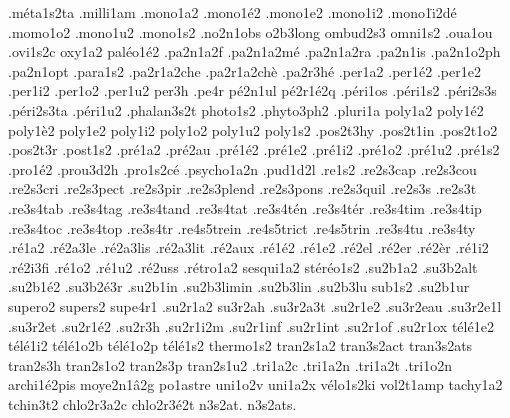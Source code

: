 {.m\'eta1s2ta
.milli1am
.mono1a2
.mono1\'e2
.mono1e2
.mono1i2
.mono1\"\i2d\'e
.momo1o2
.mono1u2
.mono1s2
.no2n1obs
o2b3long
ombud2s3
omni1s2
.oua1ou
.ovi1s2c
oxy1a2
pal\'eo1\'e2
.pa2n1a2f
.pa2n1a2m\'e
.pa2n1a2ra
.pa2n1is
.pa2n1o2ph
.pa2n1opt
.para1s2
.pa2r1a2che
.pa2r1a2ch\`e
.pa2r3h\'e
.per1a2
.per1\'e2
.per1e2
.per1i2
.per1o2
.per1u2
per3h
.pe4r
p\'e2n1ul
p\'e2r1\'e2q
.p\'eri1os
.p\'eri1s2
.p\'eri2s3s
.p\'eri2s3ta
.p\'eri1u2
.phalan3s2t
photo1s2
.phyto3ph2
.pluri1a
poly1a2
poly1\'e2
poly1\`e2
poly1e2
poly1i2
poly1o2
poly1u2
poly1s2
.pos2t3hy
.pos2t1in
.pos2t1o2
.pos2t3r
.post1s2
.pr\'e1a2
.pr\'e2au
.pr\'e1\'e2
.pr\'e1e2
.pr\'e1i2
.pr\'e1o2
.pr\'e1u2
.pr\'e1s2
.pro1\'e2
.prou3d2h
.pro1s2c\'e
.psycho1a2n
.pud1d2l
.re1s2
.re2s3cap
.re2s3cou
.re2s3cri
.re2s3pect
.re2s3pir
.re2s3plend
.re2s3pons
.re2s3quil
.re2s3s
.re2s3t
.re3s4tab
.re3s4tag
.re3s4tand
.re3s4tat
.re3s4t\'en
.re3s4t\'er
.re3s4tim
.re3s4tip
.re3s4toc
.re3s4top
.re3s4tr
.re4s5trein
.re4s5trict
.re4s5trin
.re3s4tu
.re3s4ty
.r\'e1a2
.r\'e2a3le
.r\'e2a3lis
.r\'e2a3lit
.r\'e2aux
.r\'e1\'e2
.r\'e1e2
.r\'e2el
.r\'e2er
.r\'e2\`er
.r\'e1i2
.r\'e2i3fi
.r\'e1o2
.r\'e1u2
.r\'e2uss
.r\'etro1a2
sesqui1a2
st\'er\'eo1s2
.su2b1a2
.su3b2alt
.su2b1\'e2
.su3b2\'e3r
.su2b1in
.su2b3limin
.su2b3lin
.su2b3lu
sub1s2
.su2b1ur
supero2
supers2
supe4r1
.su2r1a2
su3r2ah
.su3r2a3t
.su2r1e2
.su3r2eau
.su3r2e1l
.su3r2et
.su2r1\'e2
.su2r3h
.su2r1i2m
.su2r1inf
.su2r1int
.su2r1of
.su2r1ox
t\'el\'e1e2
t\'el\'e1i2
t\'el\'e1o2b
t\'el\'e1o2p
t\'el\'e1s2
thermo1s2
tran2s1a2
tran3s2act
tran3s2ats
tran2s3h
tran2s1o2
tran2s3p
tran2s1u2
.tri1a2c
.tri1a2n
.tri1a2t
.tri1o2n
archi1\'e2pis
moye2n1\^a2g
po1astre
uni1o2v
uni1a2x
v\'elo1s2ki
vol2t1amp
tachy1a2
tchin3t2
chlo2r3a2c
chlo2r3\'e2t
n3s2at.
n3s2ats.
}
\endgroup 